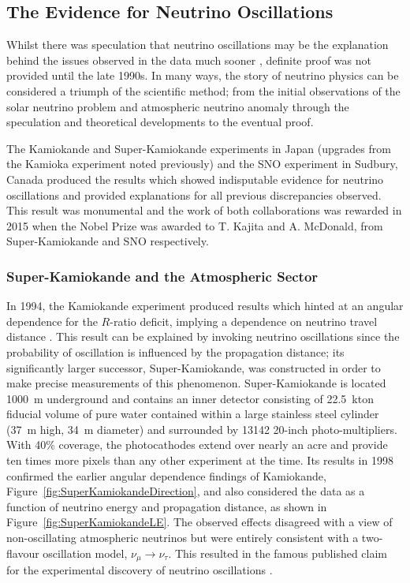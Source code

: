 \subsection{The Evidence for Neutrino Oscillations}\label{sec:EvidenceNeutrinoOscillations}

Whilst there was speculation that neutrino oscillations may be the explanation behind the issues observed in the data much sooner \cite{Casper1991,BeckerSzendy1992}, definite proof was not provided until the late 1990s.  In many ways, the story of neutrino physics can be considered a triumph of the scientific method; from the initial observations of the solar neutrino problem and atmospheric neutrino anomaly through the speculation and theoretical developments to the eventual proof.

The Kamiokande and Super-Kamiokande experiments in Japan (upgrades from the Kamioka experiment noted previously) and the SNO experiment in Sudbury, Canada produced the results which showed indisputable evidence for neutrino oscillations and provided explanations for all previous discrepancies observed.  This result was monumental and the work of both collaborations was rewarded in 2015 when the Nobel Prize was awarded to T. Kajita and A. McDonald, from Super-Kamiokande and SNO respectively.

\subsubsection{Super-Kamiokande and the Atmospheric Sector}\label{sec:SuperKamiokande}

In 1994, the Kamiokande experiment produced results which hinted at an angular dependence for the $R$-ratio deficit, implying a dependence on neutrino travel distance \cite{Kamiokande1994}.  This result can be explained by invoking neutrino oscillations since the probability of oscillation is influenced by the propagation distance; its significantly larger successor, Super-Kamiokande, was constructed in order to make precise measurements of this phenomenon.  Super-Kamiokande is located 1000~m underground and contains an inner detector consisting of 22.5~kton fiducial volume of pure water contained within a large stainless steel cylinder (37~m high, 34~m diameter) and surrounded by 13142 20-inch photo-multipliers.  With 40\% coverage, the photocathodes extend over nearly an acre and provide ten times more pixels than any other experiment at the time.  Its results in 1998 confirmed the earlier angular dependence findings of Kamiokande, Figure~\ref{fig:SuperKamiokandeDirection}, and also considered the data as a function of neutrino energy and propagation distance, as shown in Figure~\ref{fig:SuperKamiokandeLE}.  The observed effects disagreed with a view of non-oscillating atmospheric neutrinos but were entirely consistent with a two-flavour oscillation model, $\nu_{\mu} \rightarrow \nu_{\tau}$.  This resulted in the famous published claim for the experimental discovery of neutrino oscillations \cite{SuperKamiokande1998}.

